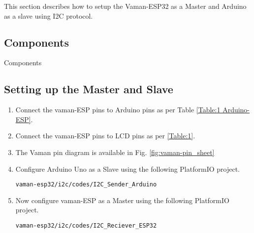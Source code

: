 This section describes how to setup the Vaman-ESP32 as a Master and Arduino as a
slave using I2C protocol.
\subsection{Components}

\begin{table}[!ht]
\centering

\caption{Components}
\label{table:i2c-components}
\end{table}

\subsection{Setting up the Master and Slave}
\begin{enumerate}[label=\thesection.\arabic*.,ref=\thesection.\theenumi]

\item
Connect the vaman-ESP pins to Arduino pins as per Table \ref{Table:1 Arduino-ESP}.
\begin{table}[!ht]
\centering

\caption{}
\label{Table:1 Arduino-ESP}
\end{table}

\item Connect the vaman-ESP pins to LCD pins as per \ref{Table:1}.

\item The Vaman pin diagram is available in Fig. \ref{fig:vaman-pin_sheet}

\item
Configure Arduino Uno as a Slave using the following PlatformIO project.
\begin{lstlisting}
vaman-esp32/i2c/codes/I2C_Sender_Arduino
\end{lstlisting}
\item
Now configure vaman-ESP as a Master using the following PlatformIO project.
\begin{lstlisting}
vaman-esp32/i2c/codes/I2C_Reciever_ESP32
\end{lstlisting}

\end{enumerate}